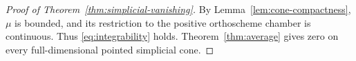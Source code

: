 \documentclass[11pt]{article}
\newcommand{\eps}{\varepsilon}
\DeclareMathOperator{\sgn}{sgn}
\DeclareMathOperator{\diag}{diag}
\begin{document}


\begin{proof}[Proof of Theorem~\ref{thm:simplicial-vanishing}]
By Lemma~\ref{lem:cone-compactness}, $\mu$ is bounded, and its restriction
to the positive orthoscheme chamber is continuous. Thus
\eqref{eq:integrability} holds. Theorem~\ref{thm:average} gives zero on
every full-dimensional pointed simplicial cone.
\end{proof}



\end{document}
